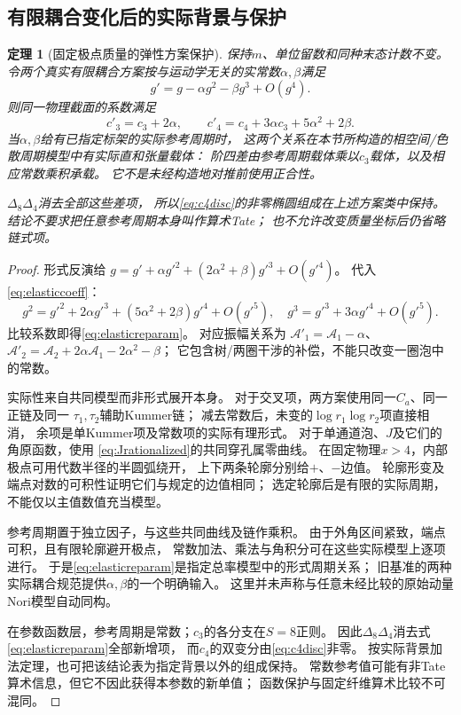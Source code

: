 \documentclass[11pt,a4paper]{ctexart}
\theoremstyle{cnplain}\newtheorem{theorem}{定理}[section]
\theoremstyle{definition}\newtheorem{definition}[theorem]{定义}
\theoremstyle{remark}\newtheorem{remark}[theorem]{注}
\begin{document}
\subsection{有限耦合变化后的实际背景与保护}
\begin{theorem}[固定极点质量的弹性方案保护]\label{thm:elasticscheme}
保持$m$、单位留数和同种末态计数不变。
令两个真实有限耦合方案按与运动学无关的实常数$\alpha,\beta$满足
\[
 g'=g-\alpha g^2-\beta g^3+O(g^4).
\]
则同一物理截面的系数满足
\begin{equation}\label{eq:elasticreparam}
 c'_3=c_3+2\alpha,\qquad
 c'_4=c_4+3\alpha c_3+5\alpha^2+2\beta .
\end{equation}
当$\alpha,\beta$给有已指定标架的实际参考周期时，
这两个关系在本节所构造的相空间/色散周期模型中有实际直和张量载体：
阶四差由参考周期载体乘以$c_3$载体，以及相应常数乘积承载。
它不是未经构造地对推前使用正合性。

$\Delta_8\Delta_4$消去全部这些差项，
所以\eqref{eq:c4disc}的非零椭圆组成在上述方案类中保持。
结论不要求把任意参考周期本身叫作算术Tate；
也不允许改变质量坐标后仍省略链式项。
\end{theorem}
\begin{proof}
形式反演给
$g=g'+\alpha g'^2+(2\alpha^2+\beta)g'^3+O(g'^4)$。
代入\eqref{eq:elasticcoeff}：
\[
 g^2=g'^2+2\alpha g'^3+(5\alpha^2+2\beta)g'^4+O(g'^5),
 \quad
 g^3=g'^3+3\alpha g'^4+O(g'^5).
\]
比较系数即得\eqref{eq:elasticreparam}。
对应振幅关系为
$\mathcal A'_1=\mathcal A_1-\alpha$、
$\mathcal A'_2=\mathcal A_2+2\alpha\mathcal A_1-2\alpha^2-\beta$；
它包含树/两圈干涉的补偿，不能只改变一圈泡中的常数。

实际性来自共同模型而非形式展开本身。
对于交叉项，两方案使用同一$C_a$、同一正链及同一
$\tau_1,\tau_2$辅助Kummer链；
减去常数后，未变的$\log r_1\log r_2$项直接相消，
余项是单Kummer项及常数项的实际有理形式。
对于单通道泡、$J$及它们的角原函数，使用
\eqref{eq:Jrationalized}的共同穿孔属零曲线。
在固定物理$x>4$，内部极点可用代数半径的半圆弧绕开，
上下两条轮廓分别给$+$、$-$边值。
轮廓形变及端点对数的可积性证明它们与规定的边值相同；
选定轮廓后是有限的实际周期，不能仅以主值数值充当模型。

参考周期置于独立因子，与这些共同曲线及链作乘积。
由于外角区间紧致，端点可积，且有限轮廓避开极点，
常数加法、乘法与角积分可在这些实际模型上逐项进行。
于是\eqref{eq:elasticreparam}是指定总率模型中的形式周期关系；
旧基准的两种实际耦合规范提供$\alpha,\beta$的一个明确输入。
这里并未声称与任意未经比较的原始动量Nori模型自动同构。

在参数函数层，参考周期是常数；$c_3$的各分支在$S=8$正则。
因此$\Delta_8\Delta_4$消去式\eqref{eq:elasticreparam}全部新增项，
而$c_4$的双变分由\eqref{eq:c4disc}非零。
按实际背景加法定理，也可把该结论表为指定背景以外的组成保持。
常数参考值可能有非Tate算术信息，但它不因此获得本参数的新单值；
函数保护与固定纤维算术比较不可混同。
\end{proof}
\end{document}
